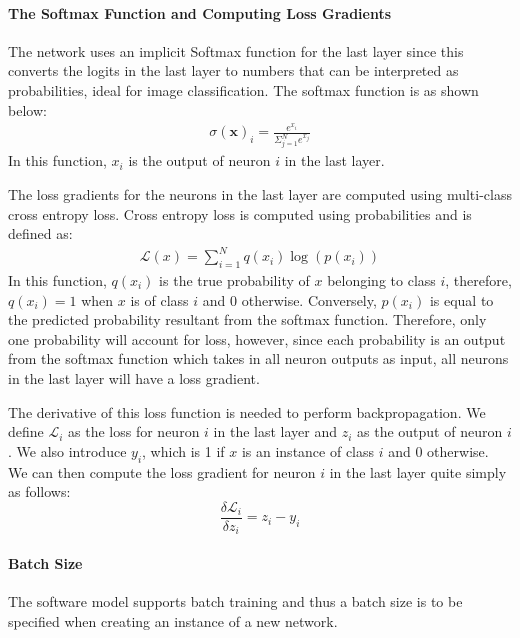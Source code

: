 \paragraph{The Softmax Function and Computing Loss Gradients}
The network uses an implicit Softmax function for the last layer since this converts the logits in the last layer to numbers that can be interpreted as probabilities, ideal for image classification. The softmax function is as shown below:
\begin{align*}
    \sigma(\mathbf{x})_i = \frac{e^{x_i}}{\Sigma_{j=1}^N e^{x_j}}
\end{align*}
In this function, $x_i$ is the output of neuron $i$ in the last layer.
\par
The loss gradients for the neurons in the last layer are computed using multi-class cross entropy loss. Cross entropy loss is computed using probabilities and is defined as:
\begin{align*}
    \mathcal{L}(x) = \sum_{i=1}^{N} q(x_i)\log(p(x_i))
\end{align*}
In this function, $q(x_i)$ is the true probability of $x$ belonging to class $i$, therefore, $q(x_i) = 1$ when $x$ is of class $i$ and $0$ otherwise. Conversely, $p(x_i)$ is equal to the predicted probability resultant from the softmax function. Therefore, only one probability will account for loss, however, since each probability is an output from the softmax function which takes in all neuron outputs as input, all neurons in the last layer will have a loss gradient.
\par 
The derivative of this loss function is needed to perform backpropagation. We define $\mathcal{L}_i$ as the loss for neuron $i$ in the last layer and $z_i$ as the output of neuron $i$. We also introduce $y_i$, which is 1 if $x$ is an instance of class $i$ and 0 otherwise. We can then compute the loss gradient for neuron $i$ in the last layer quite simply as follows: 
\[    
\frac{\delta \mathcal{L}_i}{\delta z_i} = z_i - y_i
\]

\paragraph{Batch Size}
The software model supports batch training and thus a batch size is to be specified when creating an instance of a new network.
